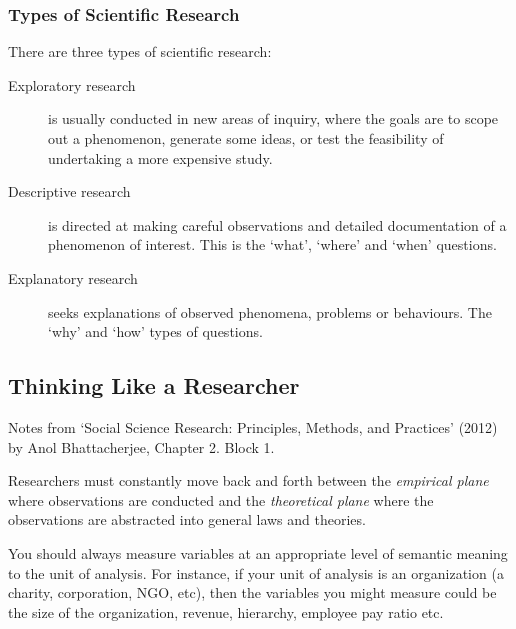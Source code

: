 \subsubsection{Types of Scientific Research}

There are three types of scientific research:


\begin{description}
  \item[Exploratory research] is usually conducted in new areas of
    inquiry, where the goals are to scope out a phenomenon, generate
    some ideas, or test the feasibility of undertaking a more expensive
    study.
  \item[Descriptive research] is directed at making careful
    observations and detailed documentation of a phenomenon of
    interest. This is the `what', `where' and `when' questions.
  \item[Explanatory research] seeks explanations of observed phenomena,
    problems or behaviours. The `why' and `how' types of questions.
\end{description}


\subsection{Thinking Like a Researcher}
\begin{flushright}
  \scriptsize Notes from `Social Science Research: Principles, Methods, and
  Practices' (2012) by Anol Bhattacherjee, Chapter 2. Block 1.
\end{flushright}

Researchers must constantly move back and forth between the
\textit{empirical plane} where observations are conducted and the
\textit{theoretical plane} where the observations are abstracted into
general laws and theories.


You should always measure variables at an appropriate level of
semantic meaning to the unit of analysis. For instance, if your unit
of analysis is an organization (a charity, corporation, NGO, etc),
then the variables you might measure could be the size of the
organization, revenue, hierarchy, employee pay ratio etc.

